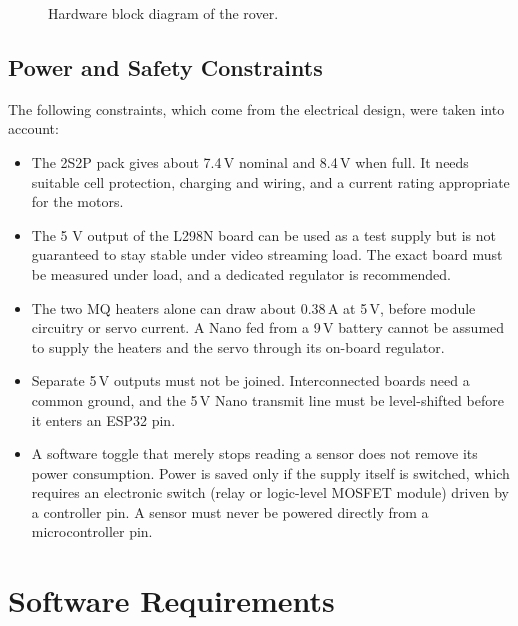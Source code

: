\begin{figure}[H]
\centering

\caption{Hardware block diagram of the rover.}
\label{fig:hwblock}
\end{figure}

\subsection{Power and Safety Constraints}

The following constraints, which come from the electrical design, were taken into account:

\begin{itemize}
\item The 2S2P pack gives about 7.4\,V nominal and 8.4\,V when full. It needs suitable cell protection, charging and wiring,
      and a current rating appropriate for the motors.
\item The 5 V output of the L298N board can be used as a test supply but is not guaranteed to stay stable under video
      streaming load. The exact board must be measured under load, and a dedicated regulator is recommended.
\item The two MQ heaters alone can draw about 0.38\,A at 5\,V, before module circuitry or servo current. A Nano fed from a 9\,V
      battery cannot be assumed to supply the heaters and the servo through its on-board regulator.
\item Separate 5\,V outputs must not be joined. Interconnected boards need a common ground, and the 5\,V Nano transmit line must
      be level-shifted before it enters an ESP32 pin.
\item A software toggle that merely stops reading a sensor does not remove its power consumption. Power is saved only if the
      supply itself is switched, which requires an electronic switch (relay or logic-level MOSFET module) driven by a
      controller pin. A sensor must never be powered directly from a microcontroller pin.
\end{itemize}

\section{Software Requirements}


